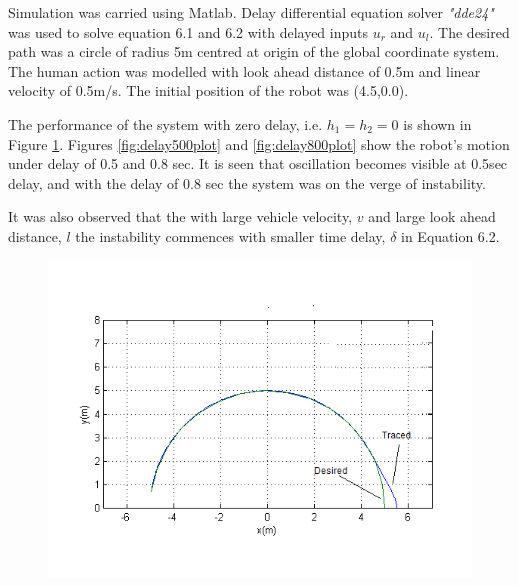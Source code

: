 Simulation was carried using Matlab. Delay differential equation solver \textit{"dde24"} was used to solve equation 6.1 and 6.2 with delayed inputs $u_r$ and $u_l$.  The desired path  was a circle of radius 5m centred at origin of the global coordinate system. The human action was modelled with look ahead distance of 0.5m and linear velocity of 0.5m/s. The initial position of the robot was (4.5,0.0).

 The  performance of the system with zero delay, i.e. $h_1=h_2=0$ is shown in Figure \ref{fig:nodelayplot}. Figures \ref{fig:delay500plot} and \ref{fig:delay800plot} show the   robot's motion under delay of 0.5 and 0.8 sec.  It is seen that oscillation becomes visible at 0.5sec delay, and with the delay of  0.8 sec the system was on the verge of instability. 
 
 It was also observed that the with large vehicle velocity, $v$ and large look ahead distance, $l$ the instability commences with smaller time delay, $\delta$ in Equation 6.2.  
\begin{figure}[h]
	\includegraphics[width=\linewidth,keepaspectratio]{Chapter6/fig/noDelay}
	\label{fig:nodelayplot} 
\end{figure} 
